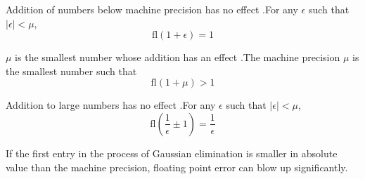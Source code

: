 \documentclass[12pt,letterpaper]{article}
\newcommand{\fl}{\mathrm{fl}}
\begin{document}
\begin{coro}{Addition of numbers below machine precision has no effect}
.For any $\epsilon$ such that $\left| \epsilon \right| < \mu$,
\begin{equation}
	\fl(1 + \epsilon) = 1
\end{equation}
\end{coro}

\begin{coro}{$\mu$ is the smallest number whose addition has an effect}
.The machine precision $\mu$ is the smallest number such that
\begin{equation}
	\fl(1 + \mu) > 1
\end{equation}
\end{coro}

\begin{coro}{Addition to large numbers has no effect}
.For any $\epsilon$ such that $\left| \epsilon \right| < \mu$,
\begin{equation}
	\fl\left(\frac{1}{\epsilon} \pm 1\right) = \frac{1}{\epsilon}
\end{equation}
\end{coro}

If the first entry in the process of Gaussian elimination is smaller in absolute value than the machine precision, floating point error can blow up significantly.
\end{document}
